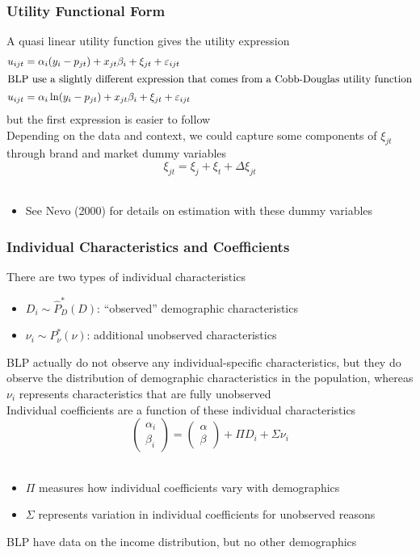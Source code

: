 \documentclass{beamer}
\begin{document}
\begin{frame}\frametitle{Utility Functional Form}
    A quasi linear utility function gives the utility expression
    \begin{align*}
    u_{ijt} &= \alpha_i (y_i - p_{jt}) + x_{jt} \beta_i + \xi_{jt} + \varepsilon_{ijt} \\
    \intertext{BLP use a slightly different expression that comes from a Cobb-Douglas utility function}
    u_{ijt} &= \alpha_i \ln(y_i - p_{jt}) + x_{jt} \beta_i + \xi_{jt} + \varepsilon_{ijt}
    \end{align*}
    but the first expression is easier to follow \\
    \vspace{2ex}
    Depending on the data and context, we could capture some components of $\xi_{jt}$ through brand and market dummy variables
    $$\xi_{jt} = \xi_j + \xi_t + \Delta \xi_{jt}$$\\
    \begin{itemize}
        \item See Nevo (2000) for details on estimation with these dummy variables
    \end{itemize}
\end{frame}

\begin{frame}\frametitle{Individual Characteristics and Coefficients}
    There are two types of individual characteristics
    \begin{itemize}
        \item $D_i \sim \hat{P}_D^*(D)$: ``observed'' demographic characteristics
        \item $\nu_i \sim P_{\nu}^*(\nu)$: additional unobserved characteristics
    \end{itemize}
    BLP actually do not observe any individual-specific characteristics, but they do observe the distribution of demographic characteristics in the population, whereas $\nu_i$ represents characteristics that are fully unobserved \\
    \vspace{2ex}
    Individual coefficients are a function of these individual characteristics
    $$\begin{pmatrix}
        \alpha_i \\
        \beta_i
    \end{pmatrix} = \begin{pmatrix}
        \alpha \\
        \beta
    \end{pmatrix} + \Pi D_i + \Sigma \nu_i$$ \\
    \vspace{-1ex}
    \begin{itemize}
        \item $\Pi$ measures how individual coefficients vary with demographics
        \item $\Sigma$ represents variation in individual coefficients for unobserved reasons
    \end{itemize}
    \vspace{2ex}
    BLP have data on the income distribution, but no other demographics
\end{frame}
\end{document}
